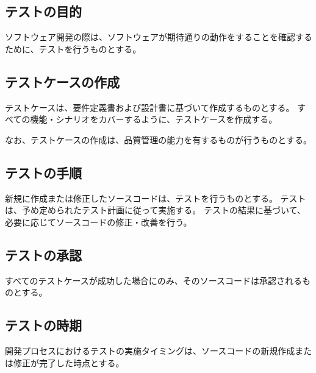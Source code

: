 \subsection{テストの目的}
ソフトウェア開発の際は、ソフトウェアが期待通りの動作をすることを確認するために、テストを行うものとする。

\subsection{テストケースの作成}
テストケースは、要件定義書および設計書に基づいて作成するものとする。
すべての機能・シナリオをカバーするように、テストケースを作成する。

なお、テストケースの作成は、品質管理の能力を有するものが行うものとする。

\subsection{テストの手順}
新規に作成または修正したソースコードは、テストを行うものとする。
テストは、予め定められたテスト計画に従って実施する。
テストの結果に基づいて、必要に応じてソースコードの修正・改善を行う。

\subsection{テストの承認}
すべてのテストケースが成功した場合にのみ、そのソースコードは承認されるものとする。

\subsection{テストの時期}
開発プロセスにおけるテストの実施タイミングは、ソースコードの新規作成または修正が完了した時点とする。

